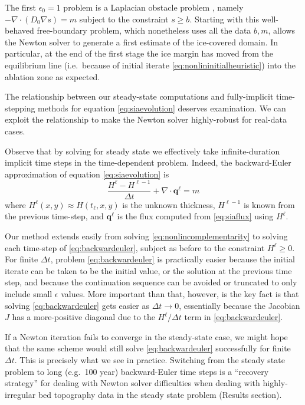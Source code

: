 \documentclass[twocolumn,letterpaper]{igs}
\newcommand\bq{\mathbf{q}}
\newcommand{\Div}{\nabla\cdot}
\newcommand\eps{\epsilon}
\newcommand{\grad}{\nabla}
\begin{document}
The first $\eps_0=1$ problem is a Laplacian obstacle problem \citep{KinderlehrerStampacchia1980}, namely $-\Div(D_0 \grad s) = m$ subject to the constraint $s\ge b$.  Starting with this well-behaved free-boundary problem, which nonetheless uses all the data $b,m$, allows the Newton solver to generate a first estimate of the ice-covered domain.  In particular, at the end of the first stage the ice margin has moved from the equilibrium line (i.e.~because of initial iterate \eqref{eq:nonlininitialheuristic}) into the ablation zone as expected.

The relationship between our steady-state computations and fully-implicit time-stepping methods for equation \eqref{eq:siaevolution} deserves examination.  We can exploit the relationship to make the Newton solver highly-robust for real-data cases.

Observe that by solving for steady state we effectively take infinite-duration implicit time steps in the time-dependent problem.  Indeed, the backward-Euler \citep{MortonMayers2005} approximation of equation \eqref{eq:siaevolution} is
\begin{equation}
\frac{H^\ell - H^{\ell-1}}{\Delta t} + \Div \bq^\ell = m \label{eq:backwardeuler}
\end{equation}
where $H^\ell(x,y) \approx H(t_\ell,x,y)$ is the unknown thickness, $H^{\ell-1}$ is known from the previous time-step, and $\bq^\ell$ is the flux computed from \eqref{eq:siaflux} using $H^\ell$.

Our method extends easily from solving \eqref{eq:nonlincomplementarity} to solving each time-step of \eqref{eq:backwardeuler}, subject as before to the constraint $H^\ell\ge 0$.  For finite $\Delta t$, problem \eqref{eq:backwardeuler} is practically easier because the initial iterate can be taken to be the initial value, or the solution at the previous time step, and because the continuation sequence can be avoided or truncated to only include small $\eps$ values.  More important than that, however, is the key fact is that solving \eqref{eq:backwardeuler} gets easier as $\Delta t\to 0$, essentially because the Jacobian $J$ has a more-positive diagonal due to the $H^\ell/\Delta t$ term in \eqref{eq:backwardeuler}.

If a Newton iteration fails to converge in the steady-state case, we might hope that the same scheme would still solve \eqref{eq:backwardeuler} successfully for finite $\Delta t$. This is precisely what we see in practice.  Switching from the steady state problem to long (e.g.~100 year) backward-Euler time steps is a ``recovery strategy'' for dealing with Newton solver difficulties when dealing with highly-irregular bed topography data in the steady state problem (Results section).
\end{document}
